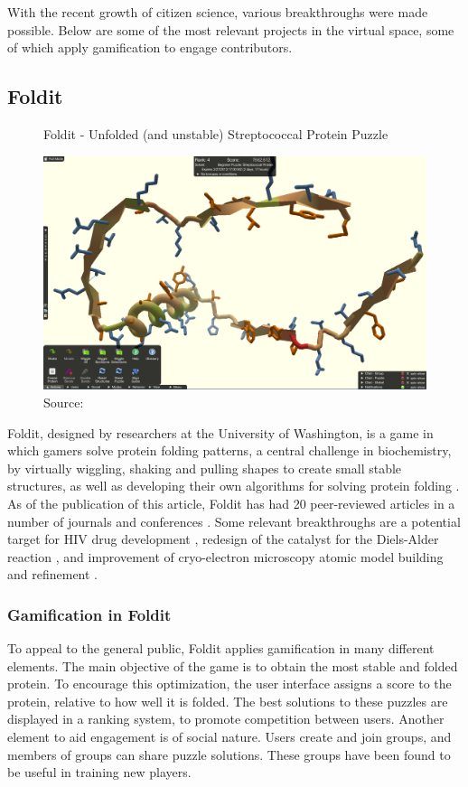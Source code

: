 With the recent growth of citizen science, various breakthroughs were made possible. Below are some of the most relevant projects in the virtual space, some of which apply gamification to engage contributors.

\subsection{Foldit}

\begin{figure}[ht]
    \centering
    \caption{Foldit - Unfolded (and unstable) Streptococcal Protein Puzzle}
    \includegraphics[width=0.8\linewidth]{images/background/foldit-problem.png}
    \caption*{Source: \cite{foldit-protein-problem}}
    \label{fig:foldit-problem}
\end{figure}

Foldit, designed by researchers at the University of Washington, is a game in which gamers solve protein folding patterns, a central challenge in biochemistry, by virtually wiggling, shaking and pulling shapes to create small stable structures, as well as developing their own algorithms for solving protein folding \cite{bourzac2008enlisting}. As of the publication of this article, Foldit has had 20 peer-reviewed articles in a number of journals and conferences \cite{foldit2021publications}. Some relevant breakthroughs are a potential target for HIV drug development \cite{khatib2011crystal}, redesign of the catalyst for the Diels-Alder reaction \cite{eiben2012increased}, and improvement of cryo-electron microscopy atomic model building and refinement \cite{khatib2019building}.

\subsubsection{Gamification in Foldit}

To appeal to the general public, Foldit applies gamification in many different elements. The main objective of the game is to obtain the most stable and folded protein. To encourage this optimization, the user interface assigns a score to the protein, relative to how well it is folded. The best solutions to these puzzles are displayed in a ranking system, to promote competition between users. Another element to aid engagement is of social nature. Users create and join groups, and members of groups can share puzzle solutions. These groups have been found to be useful in training new players.

